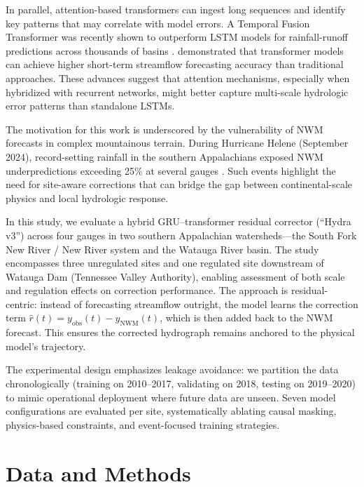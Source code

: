 \documentclass[draft]{agujournal2019}
\begin{document}
In parallel, attention-based transformers can ingest long sequences and identify key patterns that may correlate with model errors. A Temporal Fusion Transformer was recently shown to outperform LSTM models for rainfall-runoff predictions across thousands of basins \cite{rasiya2023}.  demonstrated that transformer models can achieve higher short-term streamflow forecasting accuracy than traditional approaches. These advances suggest that attention mechanisms, especially when hybridized with recurrent networks, might better capture multi-scale hydrologic error patterns than standalone LSTMs.

The motivation for this work is underscored by the vulnerability of NWM forecasts in complex mountainous terrain. During Hurricane Helene (September 2024), record-setting rainfall in the southern Appalachians exposed NWM underpredictions exceeding 25\% at several gauges \cite{usgsHelene2024, nwsRFCHelene2024}. Such events highlight the need for site-aware corrections that can bridge the gap between continental-scale physics and local hydrologic response.

In this study, we evaluate a hybrid GRU--transformer residual corrector (``Hydra v3'') across four gauges in two southern Appalachian watersheds---the South Fork New River / New River system and the Watauga River basin. The study encompasses three unregulated sites and one regulated site downstream of Watauga Dam (Tennessee Valley Authority), enabling assessment of both scale and regulation effects on correction performance. The approach is residual-centric: instead of forecasting streamflow outright, the model learns the correction term $\hat{r}(t) = y_{\mathrm{obs}}(t) - y_{\mathrm{NWM}}(t)$, which is then added back to the NWM forecast. This ensures the corrected hydrograph remains anchored to the physical model's trajectory.

The experimental design emphasizes leakage avoidance: we partition the data chronologically (training on 2010--2017, validating on 2018, testing on 2019--2020) to mimic operational deployment where future data are unseen. Seven model configurations are evaluated per site, systematically ablating causal masking, physics-based constraints, and event-focused training strategies.


\section{Data and Methods}
\end{document}
